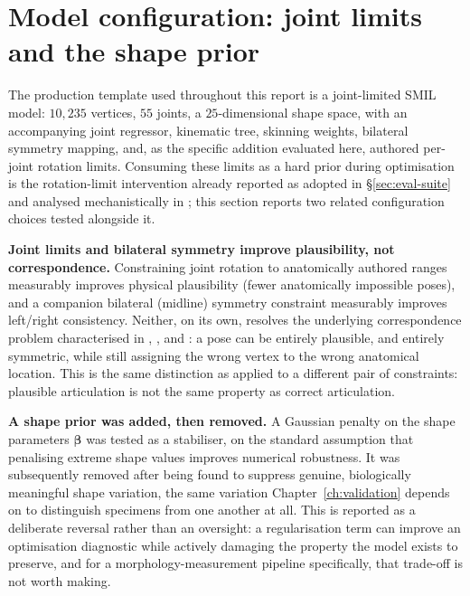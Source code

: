 \section{Model configuration: joint limits and the shape prior}
\label{sec:model-configuration}

The production template used throughout this report is a joint-limited
SMIL model: $10{,}235$ vertices, $55$ joints, a $25$-dimensional shape space,
with an accompanying joint regressor, kinematic tree, skinning weights,
bilateral symmetry mapping, and, as the specific addition evaluated here,
authored per-joint rotation limits. Consuming these limits as a hard prior
during optimisation is the rotation-limit intervention already reported as
adopted in \S\ref{sec:eval-suite} and analysed mechanistically in ;
this section reports two related configuration choices tested alongside it.

\textbf{Joint limits and bilateral symmetry improve plausibility, not
correspondence.} Constraining joint rotation to anatomically authored ranges
measurably improves physical plausibility (fewer anatomically impossible
poses), and a companion bilateral (midline) symmetry constraint measurably
improves left/right consistency. Neither, on its own, resolves the
underlying correspondence problem characterised in , , and
: a pose can be entirely plausible, and entirely symmetric, while
still assigning the wrong vertex to the wrong anatomical location. This is
the same distinction as  applied to a different pair of constraints:
plausible articulation is not the same property as correct articulation.

\textbf{A shape prior was added, then removed.} A Gaussian penalty on the
shape parameters $\bm\beta$ was tested as a stabiliser, on the standard
assumption that penalising extreme shape values improves numerical
robustness. It was subsequently removed after being found to suppress
genuine, biologically meaningful shape variation, the same variation
Chapter~\ref{ch:validation} depends on to distinguish specimens from one
another at all. This is reported as a deliberate reversal rather than an
oversight: a regularisation term can improve an optimisation diagnostic
while actively damaging the property the model exists to preserve, and for
a morphology-measurement pipeline specifically, that trade-off is not worth
making.
